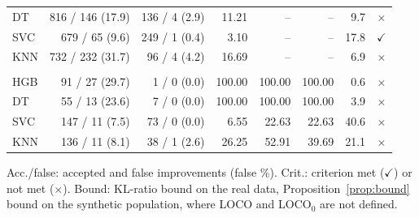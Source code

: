 \begin{table}[!htb]
\begin{tabular}{@{}lrrrrrrc@{}}
DT & 816 / 146 (17.9) & 136 / 4 (2.9) & 11.21 & -- & -- & 9.7 & $\times$ \\
SVC & 679 / 65 (9.6) & 249 / 1 (0.4) & 3.10 & -- & -- & 17.8 & $\checkmark$ \\
KNN & 732 / 232 (31.7) & 96 / 4 (4.2) & 16.69 & -- & -- & 6.9 & $\times$ \\
\addlinespace
\multicolumn{8}{@{}l}{\textit{(D) 3 multiclass datasets}} \\
HGB & 91 / 27 (29.7) & 1 / 0 (0.0) & 100.00 & 100.00 & 100.00 & 0.6 & $\times$ \\
DT & 55 / 13 (23.6) & 7 / 0 (0.0) & 100.00 & 100.00 & 100.00 & 3.9 & $\times$ \\
SVC & 147 / 11 (7.5) & 73 / 0 (0.0) & 6.55 & 22.63 & 22.63 & 40.6 & $\times$ \\
KNN & 136 / 11 (8.1) & 38 / 1 (2.6) & 26.25 & 52.91 & 39.69 & 21.1 & $\times$ \\
\bottomrule
\end{tabular}

\vspace{2pt}
\parbox{\linewidth}{\justifying\scriptsize *Acc./false: accepted and false improvements (false \%). Crit.: criterion met ($\checkmark$) or not met ($\times$). Bound: KL-ratio bound on the real data, Proposition~\ref{prop:bound} bound on the synthetic population, where LOCO and LOCO$_0$ are not defined.}
\end{table}
